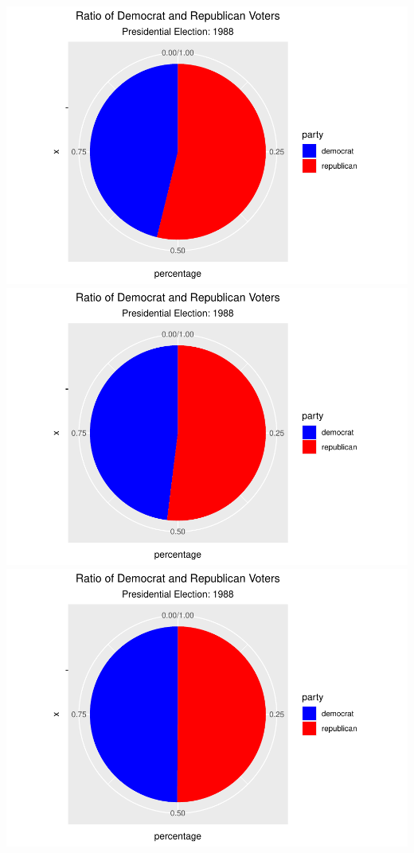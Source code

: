 \documentclass[
]{article}
\begin{document}
\includegraphics{election_files/figure-latex/anim-34.pdf}
\includegraphics{election_files/figure-latex/anim-35.pdf}
\includegraphics{election_files/figure-latex/anim-36.pdf}
\end{document}
